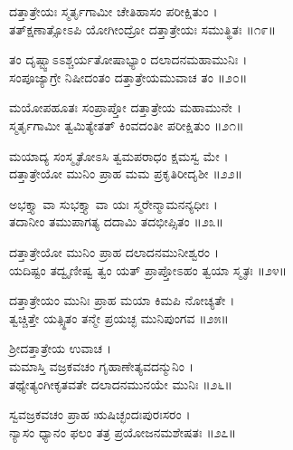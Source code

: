 ದತ್ತಾತ್ರೇಯಃ ಸ್ಮರ್ತೃಗಾಮೀ ಚೇತಿಹಾಸಂ ಪರೀಕ್ಷಿತುಂ ।\\
ತತ್ಕ್ಷಣಾತ್ಸೋಽಪಿ ಯೋಗೀಂದ್ರೋ ದತ್ತಾತ್ರೇಯಃ ಸಮುತ್ಥಿತಃ ॥೧೯॥

ತಂ ದೃಷ್ಟ್ವಾಽಽಶ್ಚರ್ಯತೋಷಾಭ್ಯಾಂ ದಲಾದನಮಹಾಮುನಿಃ ।\\
ಸಂಪೂಜ್ಯಾಗ್ರೇ ನಿಷೀದಂತಂ ದತ್ತಾತ್ರೇಯಮುವಾಚ ತಂ ॥೨೦॥

ಮಯೋಪಹೂತಃ ಸಂಪ್ರಾಪ್ತೋ ದತ್ತಾತ್ರೇಯ ಮಹಾಮುನೇ ।\\
ಸ್ಮರ್ತೃಗಾಮೀ ತ್ವಮಿತ್ಯೇತತ್ ಕಿಂವದಂತೀ ಪರೀಕ್ಷಿತುಂ ॥೨೧॥

ಮಯಾದ್ಯ ಸಂಸ್ಮೃತೋಽಸಿ ತ್ವಮಪರಾಧಂ ಕ್ಷಮಸ್ವ ಮೇ ।\\
ದತ್ತಾತ್ರೇಯೋ ಮುನಿಂ ಪ್ರಾಹ ಮಮ ಪ್ರಕೃತಿರೀದೃಶೀ ॥೨೨॥

ಅಭಕ್ತ್ಯಾ ವಾ ಸುಭಕ್ತ್ಯಾ ವಾ ಯಃ ಸ್ಮರೇನ್ಮಾಮನನ್ಯಧೀಃ ।\\
ತದಾನೀಂ ತಮುಪಾಗತ್ಯ ದದಾಮಿ ತದಭೀಪ್ಸಿತಂ ॥೨೩॥

ದತ್ತಾತ್ರೇಯೋ ಮುನಿಂ ಪ್ರಾಹ ದಲಾದನಮುನೀಶ್ವರಂ ।\\
ಯದಿಷ್ಟಂ ತದ್ವೃಣೀಷ್ವ ತ್ವಂ ಯತ್ ಪ್ರಾಪ್ತೋಽಹಂ ತ್ವಯಾ ಸ್ಮೃತಃ ॥೨೪॥

ದತ್ತಾತ್ರೇಯಂ ಮುನಿಃ ಪ್ರಾಹ ಮಯಾ ಕಿಮಪಿ ನೋಚ್ಯತೇ ।\\
ತ್ವಚ್ಚಿತ್ತೇ ಯತ್ಸ್ಥಿತಂ ತನ್ಮೇ ಪ್ರಯಚ್ಛ ಮುನಿಪುಂಗವ ॥೨೫॥

ಶ್ರೀದತ್ತಾತ್ರೇಯ ಉವಾಚ ।\\
ಮಮಾಸ್ತಿ ವಜ್ರಕವಚಂ ಗೃಹಾಣೇತ್ಯವದನ್ಮುನಿಂ ।\\
ತಥ್ಯೇತ್ಯಂಗೀಕೃತವತೇ ದಲಾದನಮುನಯೇ ಮುನಿಃ ॥೨೬॥

ಸ್ವವಜ್ರಕವಚಂ ಪ್ರಾಹ ಋಷಿಚ್ಛಂದಃಪುರಃಸರಂ ।\\
ನ್ಯಾಸಂ ಧ್ಯಾನಂ ಫಲಂ ತತ್ರ ಪ್ರಯೋಜನಮಶೇಷತಃ ॥೨೭॥

